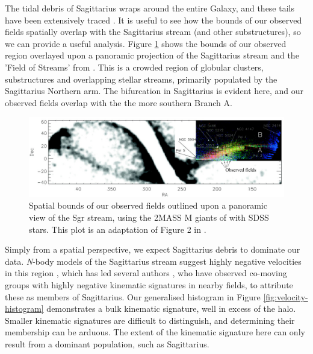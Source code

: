 \documentclass{emulateapj}
\begin{document}
	The tidal debris of Sagittarius wraps around the entire Galaxy, and these tails have been extensively traced \citep{Belokurov;et-al_2006,Newberg;et-al_2007,Yanny;et-al_2009}. It is useful to see how the bounds of our observed fields spatially overlap with the Sagittarius stream (and other substructures), so we can provide a useful analysis. Figure \ref{fig:sgr-field-of-streams} shows the bounds of our observed region overlayed upon a panoramic projection of the Sagittarius stream and the 'Field of Streams' from \citet{Belokurov;et-al_2006}. This is a crowded region of globular clusters, substructures and overlapping stellar streams, primarily populated by the Sagittarius Northern arm. The bifurcation in Sagittarius \citep{Belokurov;et-al_2006} is evident here, and our observed fields overlap with the the more southern Branch A.
			

	\begin{figure}[t]
		\centering
		\includegraphics[width=18.4cm]{./figures/belokurov2006.eps}
		\caption{Spatial bounds of our observed fields outlined upon a panoramic view of the Sgr stream, using the 2MASS M giants of \citet{Majewski;et-al_2003} with SDSS stars. This plot is an adaptation of Figure 2 in \citet{Belokurov;et-al_2006}.}
		\label{fig:sgr-field-of-streams}
	\end{figure}
	
		
	Simply from a spatial perspective, we expect Sagittarius debris to dominate our data. \textit{N}-body models of the Sagittarius stream suggest highly negative velocities in this region \citep{Law;et-al_2005,Law;Majewski_2010}, which has led several authors \citep{Yanny;et-al_2009, Prior;et-al_2009b}, who have observed co-moving groups with highly negative kinematic signatures in nearby fields, to attribute these as members of Sagittarius.  Our generalised histogram in Figure \ref{fig:velocity-histogram} demonstrates a bulk kinematic signature, well in excess of the halo. Smaller kinematic signatures are difficult to distinguish, and determining their membership can be arduous. The extent of the kinematic signature here can only result from a dominant population, such as Sagittarius. 
		
\end{document}
